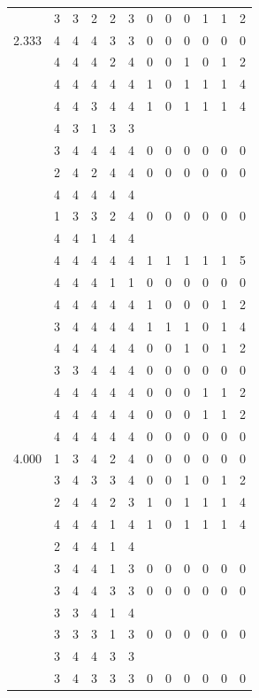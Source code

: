 \documentclass[]{msu-thesis}
\theoremstyle{definition}
\theoremstyle{definition}
\theoremstyle{definition}
\theoremstyle{remark}
\begin{document}
\begin{table}
{\begin{tabular}[t]{rrrrrrrrrrrr}
 & 3 & 3 & 2 & 2 & 3 & 0 & 0 & 0 & 1 & 1 & 2\\
2.333 & 4 & 4 & 4 & 3 & 3 & 0 & 0 & 0 & 0 & 0 & 0\\
 & 4 & 4 & 4 & 2 & 4 & 0 & 0 & 1 & 0 & 1 & 2\\
 & 4 & 4 & 4 & 4 & 4 & 1 & 0 & 1 & 1 & 1 & 4\\
 & 4 & 4 & 3 & 4 & 4 & 1 & 0 & 1 & 1 & 1 & 4\\
 & 4 & 3 & 1 & 3 & 3 &  &  &  &  &  & \\
 & 3 & 4 & 4 & 4 & 4 & 0 & 0 & 0 & 0 & 0 & 0\\
 & 2 & 4 & 2 & 4 & 4 & 0 & 0 & 0 & 0 & 0 & 0\\
 & 4 & 4 & 4 & 4 & 4 &  &  &  &  &  & \\
 & 1 & 3 & 3 & 2 & 4 & 0 & 0 & 0 & 0 & 0 & 0\\
 & 4 & 4 & 1 & 4 & 4 &  &  &  &  &  & \\
 & 4 & 4 & 4 & 4 & 4 & 1 & 1 & 1 & 1 & 1 & 5\\
 & 4 & 4 & 4 & 1 & 1 & 0 & 0 & 0 & 0 & 0 & 0\\
 & 4 & 4 & 4 & 4 & 4 & 1 & 0 & 0 & 0 & 1 & 2\\
 & 3 & 4 & 4 & 4 & 4 & 1 & 1 & 1 & 0 & 1 & 4\\
 & 4 & 4 & 4 & 4 & 4 & 0 & 0 & 1 & 0 & 1 & 2\\
 & 3 & 3 & 4 & 4 & 4 & 0 & 0 & 0 & 0 & 0 & 0\\
 & 4 & 4 & 4 & 4 & 4 & 0 & 0 & 0 & 1 & 1 & 2\\
 & 4 & 4 & 4 & 4 & 4 & 0 & 0 & 0 & 1 & 1 & 2\\
 & 4 & 4 & 4 & 4 & 4 & 0 & 0 & 0 & 0 & 0 & 0\\
4.000 & 1 & 3 & 4 & 2 & 4 & 0 & 0 & 0 & 0 & 0 & 0\\
 & 3 & 4 & 3 & 3 & 4 & 0 & 0 & 1 & 0 & 1 & 2\\
 & 2 & 4 & 4 & 2 & 3 & 1 & 0 & 1 & 1 & 1 & 4\\
 & 4 & 4 & 4 & 1 & 4 & 1 & 0 & 1 & 1 & 1 & 4\\
 & 2 & 4 & 4 & 1 & 4 &  &  &  &  &  & \\
 & 3 & 4 & 4 & 1 & 3 & 0 & 0 & 0 & 0 & 0 & 0\\
 & 3 & 4 & 4 & 3 & 3 & 0 & 0 & 0 & 0 & 0 & 0\\
 & 3 & 3 & 4 & 1 & 4 &  &  &  &  &  & \\
 & 3 & 3 & 3 & 1 & 3 & 0 & 0 & 0 & 0 & 0 & 0\\
 & 3 & 4 & 4 & 3 & 3 &  &  &  &  &  & \\
 & 3 & 4 & 3 & 3 & 3 & 0 & 0 & 0 & 0 & 0 & 0\\

\end{tabular}}
\end{table}
\end{document}

